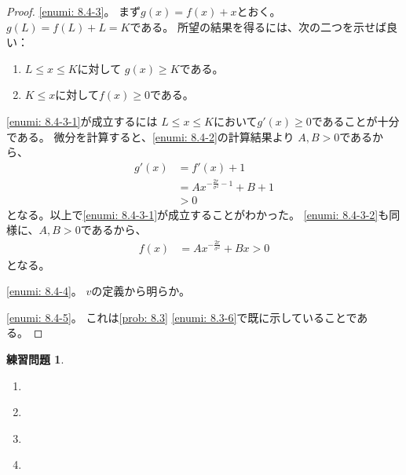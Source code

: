 \documentclass[uplatex]{jsarticle}
\theoremstyle{definition}
\newtheorem{prob}[prob]{練習問題}
\begin{document}
\begin{proof}
  \ref{enumi: 8.4-3}。
  まず\(g(x) = f(x) + x\)とおく。
  \(g(L) = f(L) + L = K\)である。
  所望の結果を得るには、次の二つを示せば良い：
  \begin{enumerate}
    \item \label{enumi: 8.4-3-1}
    \(L\leq x \leq K\)に対して
    \(g(x) \geq K\)である。
    \item \label{enumi: 8.4-3-2}
    \(K\leq x\)に対して\(f(x) \geq 0\)である。
  \end{enumerate}
  \ref{enumi: 8.4-3-1}が成立するには
  \(L \leq x \leq K\)において\(g'(x) \geq 0\)であることが十分である。
  微分を計算すると、\ref{enumi: 8.4-2}の計算結果より
  \(A,B > 0\)であるから、
  \begin{align*}
    g'(x) &= f'(x) + 1 \\
    &= Ax^{-\frac{2r}{\sigma^2}-1} + B + 1 \\
    &> 0
  \end{align*}
  となる。以上で\ref{enumi: 8.4-3-1}が成立することがわかった。
  \ref{enumi: 8.4-3-2}も同様に、\(A,B > 0\)であるから、
  \begin{align*}
    f(x) &= Ax^{-\frac{2r}{\sigma^2}} + Bx > 0
  \end{align*}
  となる。

  \ref{enumi: 8.4-4}。
  \(v\)の定義から明らか。

  \ref{enumi: 8.4-5}。
  これは\autoref{prob: 8.3} \ref{enumi: 8.3-6}で既に示していることである。
\end{proof}












\begin{prob}\label{prob: 8.5}
  \begin{enumerate}
    \item \label{enumi: 8.5-1}
    \item \label{enumi: 8.5-2}
    \item \label{enumi: 8.5-3}
    \item \label{enumi: 8.5-4}
  \end{enumerate}
\end{prob}
\end{document}
